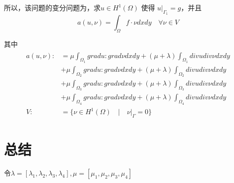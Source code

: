 \documentclass[a4paper,UTF8,titlepage]{ctexart}
\begin{document}
所以，该问题的变分问题为，求$u \in H^1(\Omega)$ 使得 $u |_{\Gamma_1} = g$，并且
$$
a(u,\nu) = \int_{\Omega} f \cdot \nu dxdy \quad \forall \nu \in V
$$ 
\par
其中
$$
\begin{matrix}
	\begin{aligned}
		a(u,\nu) :&= \mu \int_{\Omega_1} grad u : grad \nu dxdy + (\mu +\lambda) \int_{\Omega_1} div u div \nu  dxdy \\
		&+ \mu \int_{\Omega_2} grad u : grad \nu dxdy + (\mu +\lambda) \int_{\Omega_2} div u div \nu  dxdy \\
		&+ \mu \int_{\Omega_3} grad u : grad \nu dxdy + (\mu +\lambda) \int_{\Omega_3} div u div \nu  dxdy \\
		&+ \mu \int_{\Omega_4} grad u : grad \nu dxdy + (\mu +\lambda) \int_{\Omega_4} div u div \nu  dxdy\\
		V :&= \{ \nu \in H^1(\Omega) \quad | \quad \nu |_{\Gamma} = 0 \}
	\end{aligned}
\end{matrix}
$$

\section{总结}

令$\lambda=[\lambda_1,\lambda_2,\lambda_3,\lambda_4], \mu=[\mu_1,\mu_2,\mu_3,\mu_4]$

\newpage
\vfill


\clearpage
{}
{}

\end{document}

